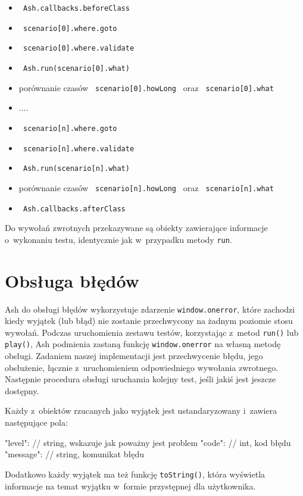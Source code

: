 \documentclass[brudnopis]{xmgr}
\begin{document}
\begin{itemize}
  \item \texttt{ Ash.callbacks.beforeClass }
  \item \texttt{ scenario[0].where.goto }
  \item \texttt{ scenario[0].where.validate }
  \item \texttt{ Ash.run(scenario[0].what) }
  \item  porównanie czasów \texttt{ scenario[0].howLong } oraz \texttt{ scenario[0].what }
  \item  ....
  \item \texttt{ scenario[n].where.goto }
  \item \texttt{ scenario[n].where.validate }
  \item \texttt{ Ash.run(scenario[n].what) }
  \item  porównanie czasów \texttt{ scenario[n].howLong } oraz \texttt{ scenario[n].what }
  \item \texttt{ Ash.callbacks.afterClass }
\end{itemize}

Do wywołań zwrotnych przekazywane są obiekty zawierające informacje o~wykonaniu testu, identycznie jak w~przypadku metody \texttt{run}.

\section{Obsługa błędów}

Ash do obsługi błędów wykorzystuje zdarzenie \texttt{window.onerror}, które zachodzi kiedy wyjątek (lub błąd) nie zostanie przechwycony na żadnym poziomie stosu wywołań. Podczas uruchomienia zestawu testów, korzystając z~metod \texttt{run()} lub \texttt{play()}, Ash podmienia zastaną funkcję \texttt{window.onerror} na własną metodę obsługi. Zadaniem naszej implementacji jest przechwycenie błędu, jego obsłużenie, łącznie z~uruchomieniem odpowiedniego wywołania zwrotnego. Następnie procedura obsługi uruchamia kolejny test, jeśli jakiś jest jeszcze dostępny. 

Każdy z~obiektów rzucanych jako wyjątek jest ustandaryzowany i~zawiera następujące pola: 
\begin{javascriptcode}
	{
		"level": // string, wskazuje jak poważny jest problem 
		"code": // int, kod błędu 
		"message": // string, komunikat błędu 
	}
\end{javascriptcode}
Dodatkowo każdy wyjątek ma też funkcję \texttt{toString()}, która wyświetla informacje na temat wyjątku w~formie przystępnej dla użytkownika.
\end{document}
